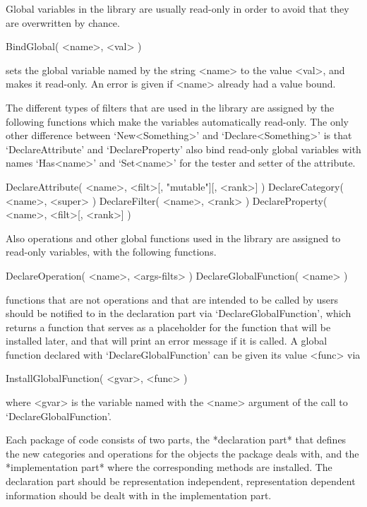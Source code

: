 Global variables in the {\GAP} library are usually read-only in order to
avoid that they are overwritten by chance.

\>BindGlobal( <name>, <val> )

sets the global variable named by the string <name> to the value <val>,
and makes it read-only.
An error is given if <name> already had a value bound.

The different types of filters that are used in the library are
assigned by the following functions which make the variables automatically
read-only.
The only other difference between `New<Something>' and
`Declare<Something>' is that `DeclareAttribute' and `DeclareProperty'
also bind read-only global variables with names `Has<name>' and `Set<name>'
for the tester and setter of the attribute.

\>DeclareAttribute( <name>, <filt>[, "mutable"][, <rank>] )
\>DeclareCategory( <name>, <super> )
\>DeclareFilter( <name>, <rank> )
\>DeclareProperty( <name>, <filt>[, <rank>] )

Also operations and other global functions used in the {\GAP} library
are assigned to read-only variables, with the following functions.

\>DeclareOperation( <name>, <args-filts> )
\>DeclareGlobalFunction( <name> )

{\GAP} functions that are not operations and that are intended to be
called by users should be notified to {\GAP} in the declaration part via
`DeclareGlobalFunction', which returns a function that serves as a
placeholder for the function that will be installed later,
and that will print an error message if it is called.
A global function declared with `DeclareGlobalFunction' can be given its
value <func> via

\>InstallGlobalFunction( <gvar>, <func> )

where <gvar> is the variable named with the <name> argument of the call
to `DeclareGlobalFunction'.



Each package of {\GAP} code consists of two parts,
the *declaration part* that defines the new categories and operations for
the objects the package deals with,
and the *implementation part* where the corresponding methods are
installed.
The declaration part should be representation independent,
representation dependent information should be dealt with in the
implementation part.


